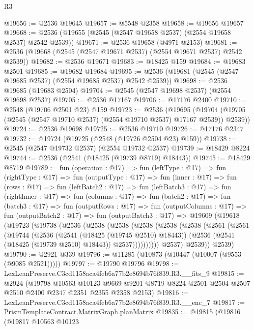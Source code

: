 \begin{lexlean}{R3}
\begin{coremodule}
@19656 := @2536 @19645
@19657 := @5548 @2358
@19658 := @19656 @19657
@19668 := @2536 (@19655 (@2545 (@2547 @19658 @2537) (@2554 @19658 @2537) @2542 @2539))
@19671 := @2536 @19658 (@4971 @2153)
@19681 := @2536 (@19668 (@2545 (@2547 @19671 @2537) (@2554 @19671 @2537) @2542 @2539))
@19682 := @2536 @19671
@19683 := @18425 @159
@19684 := @19683 @2501
@19685 := @19682 @19684
@19695 := @2536 (@19681 (@2545 (@2547 @19685 @2537) (@2554 @19685 @2537) @2542 @2539))
@19698 := @2536 @19685 (@19683 @2504)
@19704 := @2545 (@2547 @19698 @2537) (@2554 @19698 @2537)
@19705 := @2536 @17167
@19706 := @17176 @2400
@19710 := @2548 (@19706 @2501 @23) @159
@19723 := @2536
    (@19695 (@19704 (@19705 (@2545 (@2547 @19710 @2537) (@2554 @19710 @2537) @17167 @2539)) @2539))
@19724 := @2536 @19698
@19725 := @2536 @19710
@19726 := @17176 @2347
@19732 := @19724 (@19725 (@2548 (@19726 @2504 @23) @159))
@19738 := @2545 (@2547 @19732 @2537) (@2554 @19732 @2537)
@19739 := @18429 @8224
@19744 := @2536 (@2541 (@18425 (@19739 @8719) @18443))
@19745 := @18429 @8719
@19789 := fun (operation : @17) =>
  fun (leftType : @17) =>
  fun (rightType : @17) =>
  fun (outputType : @17) =>
  fun (inner : @17) =>
  fun (rows : @17) =>
  fun (leftBatch2 : @17) =>
  fun (leftBatch3 : @17) =>
  fun (rightInner : @17) =>
  fun (columns : @17) =>
  fun (batch2 : @17) =>
  fun (batch3 : @17) =>
  fun (outputRows : @17) =>
  fun (outputColumns : @17) =>
  fun (outputBatch2 : @17) =>
  fun (outputBatch3 : @17) =>
  @19609
    (@19618
      (@19723
        (@19738
          (@2536
            (@2538
              (@2538
                (@2538
                  (@2538
                    (@2538
                      (@2561
                        (@2561
                          (@19744
                            (@2536
                              (@2541 (@18425 (@19745 @2510) @18443))
                              (@2536 (@2541 (@18425 (@19739 @2510) @18443)) @2537))))))))))
            @2537)
          @2539))
      @2539)
@19790 := @2921 @339
@19796 := @11285 (@10873 (@10447 (@10007 (@9553 (@9085 @2521)))))
@19797 := @19790 @19796
@19798 := LexLeanPreserve.C3cd1158aca4feb6a77b2e8694b76f839.R3.__fits_9
@19815 := @2924
    (@19798
      @10563
      @10123
      @9669
      @9201
      @8719
      @8224
      @2501
      @2504
      @2507
      @2510
      @2400
      @2347
      @2351
      @2355
      @2358
      @2153)
@19816 := LexLeanPreserve.C3cd1158aca4feb6a77b2e8694b76f839.R3.__enc_7
@19817 := PrismTemplateContract.MatrixGraph.planMatrix
@19835 := @19815
    (@19816
      (@19817
        @10563
        @10123

\end{coremodule}
\end{lexlean}
